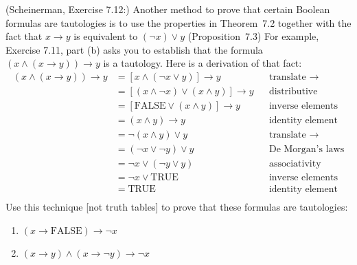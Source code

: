 \documentclass{article}
\theoremstyle{definition}
\begin{document}
\begin{question}
   (Scheinerman, Exercise 7.12:)
    Another method to prove that certain Boolean formulas
    are tautologies is to use the properties in Theorem~7.2
    together with the fact that $x \rightarrow y$ is equivalent
    to $(\neg x) \vee y$ (Proposition~7.3)
    For example, Exercise 7.11, part (b) asks you to establish that the formula $(x \wedge (x \rightarrow y)) \rightarrow y$ is 
    a tautology.  Here is a derivation of that fact:
    \begin{align*}
        (x \wedge (x \rightarrow y)) \rightarrow y
        &= [x \wedge (\neg x \vee y)] \rightarrow y
        && \text{translate $\rightarrow$} 
        \\
        &= [(x \wedge \neg x) \vee (x \wedge y)] \rightarrow y
        && \text{distributive}
        \\
        &= [\mathrm{FALSE} \vee (x\wedge y)] \rightarrow y
        && \text{inverse elements}
        \\
        &= (x\wedge y) \rightarrow y
        && \text{identity element}
        \\
        &= \neg(x\wedge y) \vee y
        && \text{translate $\rightarrow$}
        \\
        &= (\neg x \vee \neg y) \vee y
        && \text{De~Morgan's laws}
        \\
        &= \neg x \vee (\neg y \vee y)
        && \text{associativity}
        \\
        &= \neg x \vee \mathrm{TRUE}
        && \text{inverse elements}
        \\
        &= \mathrm{TRUE}
        && \text{identity element}
        \\
    \end{align*}
    Use this technique [not truth tables] to prove that these formulas
    are tautologies:
    \begin{enumerate}
        \item $(x \rightarrow \mathrm{FALSE}) \rightarrow \neg x$
        \item $(x \rightarrow y) \wedge (x \rightarrow \neg y) \rightarrow \neg x$
    \end{enumerate}
\end{question}
\end{document}
